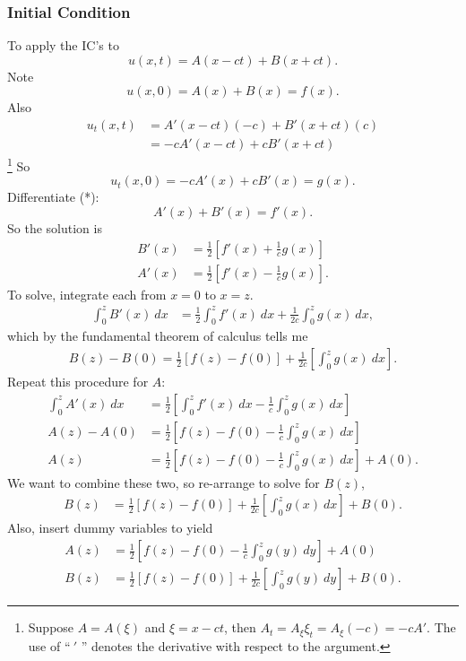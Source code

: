 \documentclass{article}
\begin{document}
\subsubsection{Initial Condition}
To apply the IC's to
$$u(x,t) = A(x-ct) + B(x+ct).$$
Note
\begin{equation*}
u(x,0) = A(x) + B(x) = f(x). \tag{*}
\end{equation*}
Also 
\begin{align*}
u_t(x,t) &= A'(x-ct)(-c) + B'(x+ct)(c) \\
&= -cA'(x-ct) + cB'(x+ct)
\end{align*}
\footnote{Suppose $A = A(\xi)$ and $\xi = x - ct$, then $A_t = A_{\xi}\xi_t = A_{\xi}(-c) = -cA'$. The use of ``$~'$ '' denotes the derivative with respect to the argument.}
So $$u_t(x,0) = -cA'(x) + cB'(x) = g(x).$$ Differentiate (*):
$$A'(x) + B'(x) = f'(x).$$
So the solution is
\begin{align*}
 B'(x) &= \frac12[f'(x) + \frac{1}{c} g(x)] \\
 A'(x) &= \frac12[f'(x) - \frac{1}{c} g(x)].
\end{align*}
To solve, integrate each from $x = 0$ to $x = z$.
\begin{align*}
\int_0^z B'(x)~dx &= \frac12 \int_0^z f'(x) ~dx + \frac{1}{2c} \int_0^z g(x)~dx,
\end{align*}
which by the fundamental theorem of calculus tells me
\begin{align*}
B(z) - B(0) = \frac12 [f(z) - f(0)] + \frac{1}{2c} \left[\int_0^z g(x)~dx\right].
\end{align*}
Repeat this procedure for $A$:
\begin{align*}
\int_0^z A'(x)~dx &= \frac12 \left[\int_0^z f'(x)~dx - \frac{1}{c} \int_0^z g(x)~dx\right]\\
A(z) - A(0) &= \frac12 \left[f(z) - f(0) - \frac{1}{c} \int_0^z g(x)~dx\right] \\
A(z) &= \frac12\left[f(z) - f(0) - \frac{1}{c} \int_0^z g(x)~dx\right] + A(0).
\end{align*}
We want to combine these two, so re-arrange to solve for $B(z)$,
\begin{align*}
B(z) &= \frac12 [f(z) - f(0)] + \frac{1}{2c} \left[\int_0^z g(x)~dx\right] + B(0).
\end{align*}
Also, insert dummy variables to yield
\begin{align*}
A(z) &= \frac12\left[f(z) - f(0) - \frac{1}{c} \int_0^z g(y)~dy\right] + A(0) \\
B(z) &= \frac12 [f(z) - f(0)] + \frac{1}{2c} \left[\int_0^z g(y)~dy\right] + B(0).
\end{align*}
\end{document}
